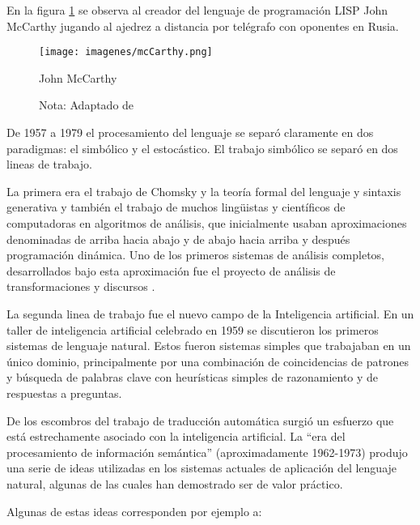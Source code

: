 \documentclass[12pt]{article}
\begin{document}
			En la figura \ref{fig:JohnMcCarthy} se observa al creador del lenguaje de programación LISP John McCarthy jugando al ajedrez a distancia por telégrafo con oponentes en Rusia. 
				
			\begin{figure}[H]
				\texttt{[image: imagenes/mcCarthy.png]}
				\centering
				\caption{John McCarthy}
				\caption*{\small Nota: Adaptado de  \cite{Khanna2020}}
				\label{fig:JohnMcCarthy}
			\end{figure}
		
		
			De 1957 a 1979 el procesamiento del lenguaje se separó claramente en dos paradigmas: el simbólico y el estocástico. El trabajo simbólico se separó en dos lineas de trabajo. 
			
			La primera era el trabajo de Chomsky y la teoría formal del lenguaje y sintaxis generativa y también el trabajo de muchos lingüistas y científicos de computadoras en algoritmos de análisis, que inicialmente usaban aproximaciones denominadas de  arriba hacia abajo y de abajo hacia arriba y después programación dinámica. Uno de los primeros sistemas de análisis completos, desarrollados bajo esta aproximación fue el proyecto de análisis de transformaciones y discursos .\cite{Kumar2011}
			
			La segunda linea de trabajo fue el nuevo campo de la Inteligencia artificial. En un taller de inteligencia artificial celebrado en 1959 se discutieron los primeros sistemas de lenguaje natural. Estos fueron sistemas simples que trabajaban en un único dominio, principalmente por una combinación de coincidencias de patrones y búsqueda de palabras clave con heurísticas simples de razonamiento y de respuestas a preguntas.\cite{Kumar2011}
			
			De los escombros del trabajo de traducción automática surgió un esfuerzo que está estrechamente asociado con la inteligencia artificial. La ``era del procesamiento de información semántica'' (aproximadamente 1962-1973) produjo una serie de ideas utilizadas en los sistemas actuales de aplicación del lenguaje natural, algunas de las cuales han demostrado ser de valor práctico.\cite{Lehnert2014}
			
			Algunas de estas ideas corresponden por ejemplo a:
			
\end{document}
